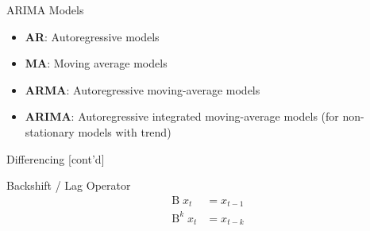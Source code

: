\documentclass[ignorenonframetext,xcolor=x11names]{beamer}
\begin{document}
\begin{frame}[label=full]{ARIMA Models}
\begin{itemize}
  \item \textbf{AR}: Autoregressive models
  \item \textbf{MA}: Moving average models
  \item \textbf{ARMA}: Autoregressive moving-average models
  \item \textbf{ARIMA}: Autoregressive integrated moving-average models (for non-stationary models with trend)
\end{itemize}
\end{frame}

\begin{frame}[label=full]{Differencing \small [cont'd]}
\begin{block}{Backshift / Lag Operator}
\vspace{-\baselineskip}
\begin{align*}\operatorname{B} x_t &= x_{t-1} \\
\operatorname{B}^k x_t &= x_{t-k} %
 \end{align*}
 \vspace{-\baselineskip}
\end{block}
\end{frame}
\end{document}
